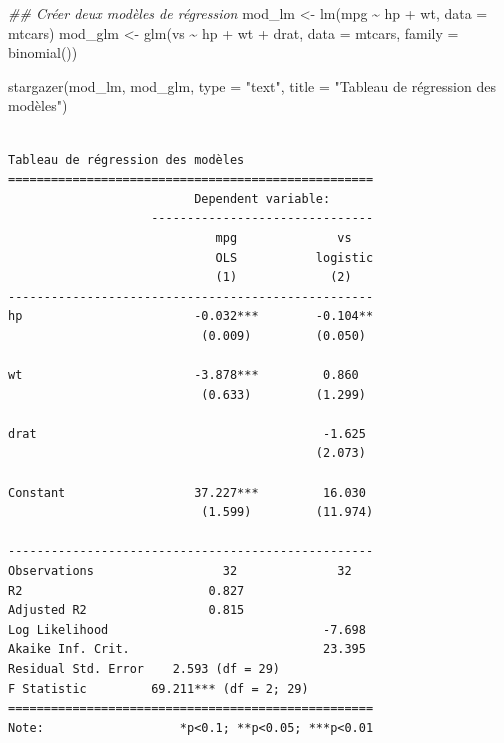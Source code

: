 \documentclass[
  letterpaper,
  DIV=11,
  numbers=noendperiod]{scrreprt}
\newenvironment{Shaded}{\begin{snugshade}}{\end{snugshade}}
\newcommand{\AttributeTok}[1]{\textcolor[rgb]{0.40,0.45,0.13}{#1}}
\newcommand{\DocumentationTok}[1]{\textcolor[rgb]{0.37,0.37,0.37}{\textit{#1}}}
\newcommand{\FunctionTok}[1]{\textcolor[rgb]{0.28,0.35,0.67}{#1}}
\newcommand{\NormalTok}[1]{\textcolor[rgb]{0.00,0.23,0.31}{#1}}
\newcommand{\OtherTok}[1]{\textcolor[rgb]{0.00,0.23,0.31}{#1}}
\newcommand{\SpecialCharTok}[1]{\textcolor[rgb]{0.37,0.37,0.37}{#1}}
\newcommand{\StringTok}[1]{\textcolor[rgb]{0.13,0.47,0.30}{#1}}
\begin{document}
\begin{Shaded}
\begin{Highlighting}[]
\DocumentationTok{\#\# Créer deux modèles de régression}
\NormalTok{mod\_lm }\OtherTok{\textless{}{-}} \FunctionTok{lm}\NormalTok{(mpg }\SpecialCharTok{\textasciitilde{}}\NormalTok{ hp }\SpecialCharTok{+}\NormalTok{ wt, }\AttributeTok{data =}\NormalTok{ mtcars)}
\NormalTok{mod\_glm }\OtherTok{\textless{}{-}} \FunctionTok{glm}\NormalTok{(vs }\SpecialCharTok{\textasciitilde{}}\NormalTok{ hp }\SpecialCharTok{+}\NormalTok{ wt }\SpecialCharTok{+}\NormalTok{ drat, }\AttributeTok{data =}\NormalTok{ mtcars, }\AttributeTok{family =} \FunctionTok{binomial}\NormalTok{())}

\FunctionTok{stargazer}\NormalTok{(mod\_lm, mod\_glm, }\AttributeTok{type =} \StringTok{"text"}\NormalTok{, }\AttributeTok{title =} \StringTok{"Tableau de régression des modèles"}\NormalTok{)}
\end{Highlighting}
\end{Shaded}

\begin{verbatim}

Tableau de régression des modèles
===================================================
                          Dependent variable:      
                    -------------------------------
                             mpg              vs   
                             OLS           logistic
                             (1)             (2)   
---------------------------------------------------
hp                        -0.032***        -0.104**
                           (0.009)         (0.050) 
                                                   
wt                        -3.878***         0.860  
                           (0.633)         (1.299) 
                                                   
drat                                        -1.625 
                                           (2.073) 
                                                   
Constant                  37.227***         16.030 
                           (1.599)         (11.974)
                                                   
---------------------------------------------------
Observations                  32              32   
R2                          0.827                  
Adjusted R2                 0.815                  
Log Likelihood                              -7.698 
Akaike Inf. Crit.                           23.395 
Residual Std. Error    2.593 (df = 29)             
F Statistic         69.211*** (df = 2; 29)         
===================================================
Note:                   *p<0.1; **p<0.05; ***p<0.01
\end{verbatim}
\end{document}
